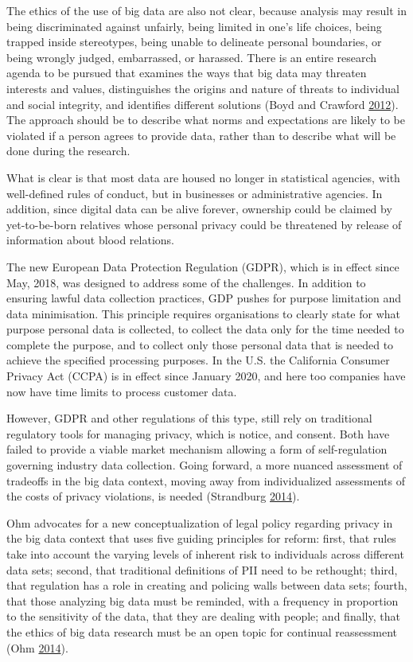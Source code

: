 \documentclass[]{krantz}
\begin{document}
The ethics of the use of big data are also not clear, because analysis
may result in being discriminated against unfairly, being limited in
one's life choices, being trapped inside stereotypes, being unable to
delineate personal boundaries, or being wrongly judged, embarrassed, or
harassed. There is an entire research agenda to be pursued that examines
the ways that big data may threaten interests and values, distinguishes
the origins and nature of threats to individual and social integrity,
and identifies different solutions (Boyd and Crawford
\protect\hyperlink{ref-boyd2012critical}{2012}). The approach should be
to describe what norms and expectations are likely to be violated if a
person agrees to provide data, rather than to describe what will be done
during the research.

What is clear is that most data are housed no longer in statistical
agencies, with well-defined rules of conduct, but in businesses or
administrative agencies. In addition, since digital data can be alive
forever, ownership could be claimed by yet-to-be-born relatives whose
personal privacy could be threatened by release of information about
blood relations.

The new European Data Protection Regulation (GDPR), which is in effect
since May, 2018, was designed to address some of the challenges. In
addition to ensuring lawful data collection practices, GDP pushes for
purpose limitation and data minimisation. This principle requires
organisations to clearly state for what purpose personal data is
collected, to collect the data only for the time needed to complete the
purpose, and to collect only those personal data that is needed to
achieve the specified processing purposes. In the U.S. the California
Consumer Privacy Act (CCPA) is in effect since January 2020, and here
too companies have now have time limits to process customer data.

However, GDPR and other regulations of this type, still rely on
traditional regulatory tools for managing privacy, which is notice, and
consent. Both have failed to provide a viable market mechanism allowing
a form of self-regulation governing industry data collection. Going
forward, a more nuanced assessment of tradeoffs in the big data context,
moving away from individualized assessments of the costs of privacy
violations, is needed (Strandburg
\protect\hyperlink{ref-Strandburg2014}{2014}).

Ohm advocates for a new conceptualization of legal policy regarding
privacy in the big data context that uses five guiding principles for
reform: first, that rules take into account the varying levels of
inherent risk to individuals across different data sets; second, that
traditional definitions of PII need to be rethought; third, that
regulation has a role in creating and policing walls between data sets;
fourth, that those analyzing big data must be reminded, with a frequency
in proportion to the sensitivity of the data, that they are dealing with
people; and finally, that the ethics of big data research must be an
open topic for continual reassessment (Ohm
\protect\hyperlink{ref-Ohm2014}{2014}).
\end{document}

